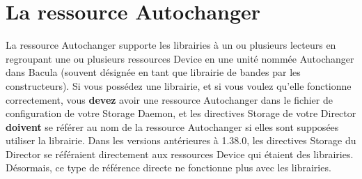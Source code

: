 \chapter{La ressource Autochanger}
\label{Autochangerres}

La ressource Autochanger supporte les librairies \`a un ou plusieurs 
lecteurs en regroupant une ou plusieurs ressources Device en une 
unit\'e nomm\'ee Autochanger dans Bacula (souvent d\'esign\'ee en tant que 
librairie de bandes par les constructeurs). Si vous poss\'edez une 
librairie, et si vous voulez qu'elle fonctionne correctement,  vous 
{\bf devez} avoir une ressource Autochanger dans le fichier de 
configuration de votre Storage Daemon, et les directives Storage 
de votre Director {\bf doivent} se r\'ef\'erer au nom de la ressource 
Autochanger si elles sont suppos\'ees utiliser la librairie. Dans les 
versions ant\'erieures \`a 1.38.0, les directives Storage du Director 
se r\'ef\'eraient directement aux ressources Device qui \'etaient des 
librairies. D\'esormais, ce type de r\'ef\'erence directe ne fonctionne 
plus avec les librairies. 
 

